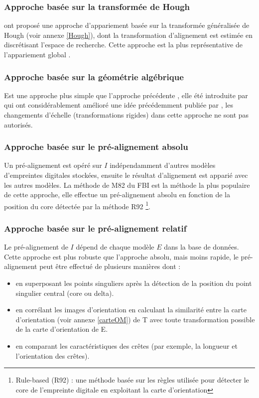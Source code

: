 \subsubsection{Approche basée sur la transformée de Hough}
\citep{ratha1996real} ont proposé une approche d'appariement basée sur la transformée généralisée de Hough (voir annexe \ref{Hough}), dont la transformation d'alignement est estimée en discrétisant l'espace de recherche. Cette approche est la plus représentative de l'appariement global \citep{maltoni2009handbook}.

\subsubsection{Approche basée sur la géométrie algébrique}
Est une approche plus simple que l'approche précédente \citep{maltoni2009handbook}, elle été introduite par \citep{udupa2001fast} qui ont considérablement amélioré une idée précédemment publiée par  \citep{weber1992cost}, les changements d'échelle (transformations rigides) dans cette approche ne sont pas autorisés. 
\subsubsection{Approche basée sur le pré-alignement absolu}
Un pré-alignement est opéré sur $ I $ indépendamment d'autres modèles d'empreintes digitales stockées, ensuite le résultat d'alignement est apparié avec les autres modèles. La méthode de M82 du FBI est la méthode la plus populaire de cette approche, elle effectue un pré-alignement absolu en fonction de la position du core détectée par la méthode R92 \footnote{Rule-based (R92) : une méthode basée sur les règles utilisée pour détecter le core de l’empreinte digitale en exploitant la carte d’orientation}.

\subsubsection{Approche basée sur le pré-alignement relatif}
Le pré-alignement de $ I $ dépend de chaque modèle $ E $ dans la base de données. Cette approche est plus robuste que l'approche absolu, mais moins rapide, le pré-alignement peut être effectué de plusieurs manières dont :
\begin{itemize}
	\item en superposant les points singuliers après la détection de la position du point singulier central (core ou delta).
	\item en corrélant les images d'orientation en calculant la similarité entre la carte d'orientation (voir annexe \ref{carteOM}) de T avec toute transformation possible de la carte d'orientation de E.
	\item en comparant les caractéristiques des crêtes (par exemple, la longueur et l'orientation des crêtes).
\end{itemize}
